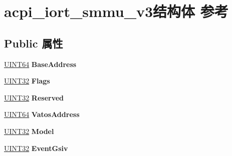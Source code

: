 \hypertarget{structacpi__iort__smmu__v3}{}\section{acpi\+\_\+iort\+\_\+smmu\+\_\+v3结构体 参考}
\label{structacpi__iort__smmu__v3}
\subsection*{Public 属性}
\begin{DoxyCompactItemize}
\item 
\mbox{\label{structacpi__iort__smmu__v3_a12e599e871c57cd5fd294b621b948788}} 
\hyperlink{_processor_bind_8h_a57be03562867144161c1bfee95ca8f7c}{U\+I\+N\+T64} {\bfseries Base\+Address}
\item 
\mbox{\label{structacpi__iort__smmu__v3_a06bf65098a4a39805f2086e8bd1e2d16}} 
\hyperlink{_processor_bind_8h_ae1e6edbbc26d6fbc71a90190d0266018}{U\+I\+N\+T32} {\bfseries Flags}
\item 
\mbox{\label{structacpi__iort__smmu__v3_a8f8c65dd831187075c7889440305a0a3}} 
\hyperlink{_processor_bind_8h_ae1e6edbbc26d6fbc71a90190d0266018}{U\+I\+N\+T32} {\bfseries Reserved}
\item 
\mbox{\label{structacpi__iort__smmu__v3_ad4541eefce1653baf92b037d3ba63b97}} 
\hyperlink{_processor_bind_8h_a57be03562867144161c1bfee95ca8f7c}{U\+I\+N\+T64} {\bfseries Vatos\+Address}
\item 
\mbox{\label{structacpi__iort__smmu__v3_a5244e459d114a7568857bc2a3a036b2a}} 
\hyperlink{_processor_bind_8h_ae1e6edbbc26d6fbc71a90190d0266018}{U\+I\+N\+T32} {\bfseries Model}
\item 
\mbox{\label{structacpi__iort__smmu__v3_abb31f65e98863f310936abdfa767cdb9}} 
\hyperlink{_processor_bind_8h_ae1e6edbbc26d6fbc71a90190d0266018}{U\+I\+N\+T32} {\bfseries Event\+Gsiv}
\item 
\mbox{\label{structacpi__iort__smmu__v3_a8c30332cae43250ce2c53073a539b3f4}} 

\end{DoxyCompactItemize}
